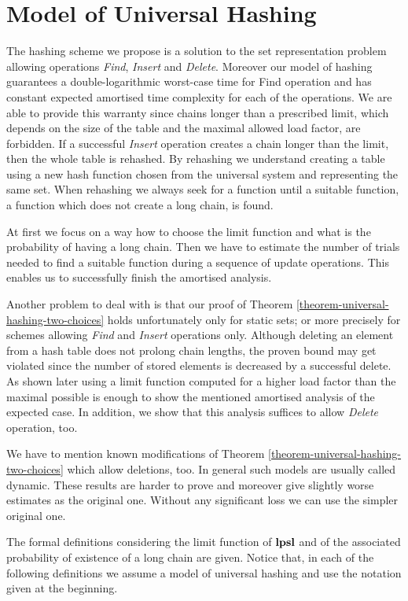 
\section{Model of Universal Hashing}
\label{section-model}
The hashing scheme we propose is a solution to the set representation problem allowing operations \emph{Find}, \emph{Insert} and \emph{Delete}. Moreover our model of hashing guarantees a double-logarithmic worst-case time for Find operation and has constant expected amortised time complexity for each of the operations. We are able to provide this warranty since chains longer than a prescribed limit, which depends on the size of the table and the maximal allowed load factor, are forbidden. If a successful \emph{Insert} operation creates a chain longer than the limit, then the whole table is rehashed. By rehashing we understand creating a table using a new hash function chosen from the universal system and representing the same set. When rehashing we always seek for a function until a suitable function, a function which does not create a long chain, is found. 

At first we focus on a way how to choose the limit function and what is the probability of having a long chain. Then we have to estimate the number of trials needed to find a suitable function during a sequence of update operations. This enables us to successfully finish the amortised analysis.

Another problem to deal with is that our proof of Theorem \ref{theorem-universal-hashing-two-choices} holds unfortunately only for static sets; or more precisely for schemes allowing \emph{Find} and \emph{Insert} operations only. Although deleting an element from a hash table does not prolong chain lengths, the proven bound may get violated since the number of stored elements is decreased by a successful delete. As shown later using a limit function computed for a higher load factor than the maximal possible is enough to show the mentioned amortised analysis of the expected case. In addition, we show that this analysis suffices to allow \emph{Delete} operation, too. 

We have to mention known modifications of Theorem \ref{theorem-universal-hashing-two-choices} which allow deletions, too. In general such models are usually called dynamic. These results are harder to prove and moreover give slightly worse estimates as the original one. Without any significant loss we can use the simpler original one.

The formal definitions considering the limit function of $\mathbf{lpsl}$ and of the associated probability of existence of a long chain are given. Notice that, in each of the following definitions we assume a model of universal hashing and use the notation given at the beginning.

